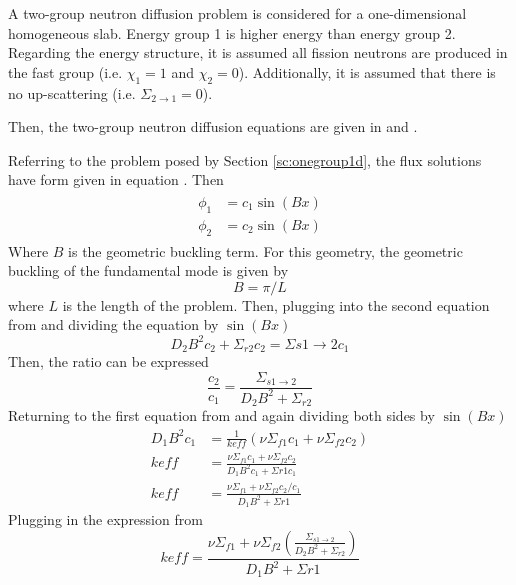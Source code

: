   A two-group neutron diffusion problem is considered for a one-dimensional
  homogeneous slab. Energy group 1 is higher energy than energy group 2. 
  Regarding the energy structure, it is assumed all fission neutrons are 
  produced in the fast group (i.e. $\chi_1=1$ and $\chi_2=0$). Additionally, 
  it is assumed that there is no up-scattering 
  (i.e. $\Sigma_{2\rightarrow1}=0$).
  
  Then, the two-group neutron diffusion equations are given in
   and .
  
  Referring to the problem posed by Section \ref{sc:onegroup1d}, the flux 
  solutions have form given in equation . Then
  \begin{align} \label{eq:twogroupflux}
  \begin{split}
    \phi_1 &= c_1 \sin(Bx) \\
    \phi_2 &= c_2 \sin(Bx)
  \end{split}
  \end{align}
  Where $B$ is the geometric buckling term. For this geometry, the geometric 
  buckling of the fundamental mode is given by 
  \begin{equation}
    B = \pi/L
  \end{equation}
  where $L$ is the length of the problem. Then, plugging 
   into the second equation from  
  and dividing the equation by $\sin(Bx)$
  \begin{equation}
    D_2 B^2 c_2 + \Sigma_{r2} c_2 = \Sigma{s1\rightarrow2} c_1
  \end{equation}
  Then, the ratio can be expressed
  \begin{equation} \label{eq:fluxratio}
    \frac{c_2}{c_1} = \frac{\Sigma_{s1\rightarrow2}}{D_2 B^2 + \Sigma_{r2}}
  \end{equation}
  Returning to the first equation from  and again dividing
  both sides by $\sin(Bx)$
  \begin{align}
    D_1 B^2 c_1 &= \frac{1}{keff} \left( \nu \Sigma_{f1} c_1 + 
      \nu \Sigma_{f2} c_2\right)\\
    keff &= \frac{\nu \Sigma_{f1} c_1 + \nu \Sigma_{f2} c_2}
      {D_1 B^2 c_1 + \Sigma{r1} c_1}\\
    keff &= \frac{\nu \Sigma_{f1} + \nu \Sigma_{f2} c_2/c_1}
      {D_1 B^2 + \Sigma{r1}}
  \end{align}
  Plugging in the expression from 
  \begin{equation}
    keff = \frac{\nu \Sigma_{f1} + \nu \Sigma_{f2} 
      \left(\frac{\Sigma_{s1\rightarrow2}}{D_2B^2+\Sigma_{r2}}\right)}
      {D_1 B^2 + \Sigma{r1}}
  \end{equation}
